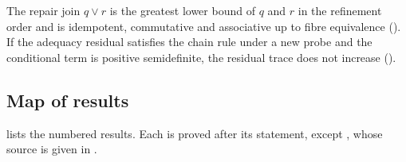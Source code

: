 \begin{headline}
The repair join $q \vee r$ is the greatest lower bound of $q$ and $r$ in the refinement order and is
idempotent, commutative and associative up to fibre equivalence (). If the adequacy
residual satisfies the chain rule under a new probe and the conditional term is positive
semidefinite, the residual trace does not increase ().
\end{headline}

\subsection{Map of results}\label{sec:intro-map}

 lists the numbered results. Each is proved after its statement, except , whose source is given in .

